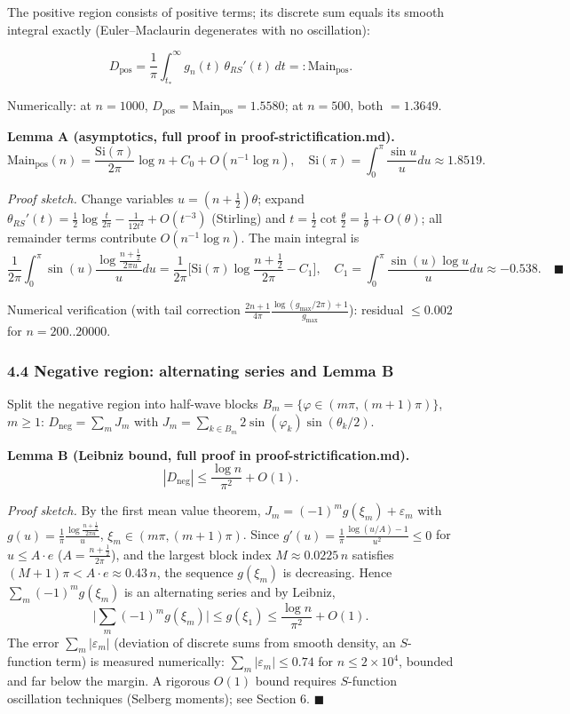 \documentclass[
]{article}
\begin{document}
The positive region consists of positive terms; its discrete sum equals
its smooth integral exactly (Euler--Maclaurin degenerates with no
oscillation):

\[D_{\mathrm{pos}} = \frac1\pi\int_{t_*}^{\infty} g_n(t)\,\theta_{RS}'(t)\,dt =: \mathrm{Main}_{\mathrm{pos}}.\]

Numerically: at \(n=1000\),
\(D_{\mathrm{pos}} = \mathrm{Main}_{\mathrm{pos}} = 1.5580\); at
\(n=500\), both \(= 1.3649\).

\textbf{Lemma A (asymptotics, full proof in proof-strictification.md).}
\[\mathrm{Main}_{\mathrm{pos}}(n) = \frac{\mathrm{Si}(\pi)}{2\pi}\log n + C_0 + O(n^{-1}\log n), \quad \mathrm{Si}(\pi) = \int_0^\pi\frac{\sin u}{u}du \approx 1.8519.\]

\emph{Proof sketch.} Change variables \(u = (n+\tfrac12)\theta\); expand
\(\theta_{RS}'(t) = \tfrac12\log\frac{t}{2\pi} - \frac{1}{12t^2} + O(t^{-3})\)
(Stirling) and
\(t = \tfrac12\cot\frac{\theta}{2} = \frac1\theta + O(\theta)\); all
remainder terms contribute \(O(n^{-1}\log n)\). The main integral is
\[\frac{1}{2\pi}\int_0^\pi \sin(u)\frac{\log\frac{n+\frac12}{2\pi u}}{u}du = \frac{1}{2\pi}\Big[\mathrm{Si}(\pi)\log\frac{n+\frac12}{2\pi} - C_1\Big], \quad C_1 = \int_0^\pi\frac{\sin(u)\log u}{u}du \approx -0.538. \quad \blacksquare\]

Numerical verification (with tail correction
\(\frac{2n+1}{4\pi}\frac{\log(g_{\max}/2\pi)+1}{g_{\max}}\)): residual
\(\le 0.002\) for \(n = 200..20000\).

\hypertarget{negative-region-alternating-series-and-lemma-b}{%
\subsubsection{4.4 Negative region: alternating series and Lemma
B}\label{negative-region-alternating-series-and-lemma-b}}

Split the negative region into half-wave blocks
\(B_m = \{\varphi \in (m\pi, (m+1)\pi)\}\), \(m \ge 1\):
\(D_{\mathrm{neg}} = \sum_m J_m\) with
\(J_m = \sum_{k\in B_m} 2\sin(\varphi_k)\sin(\theta_k/2)\).

\textbf{Lemma B (Leibniz bound, full proof in
proof-strictification.md).}
\[|D_{\mathrm{neg}}| \le \frac{\log n}{\pi^2} + O(1).\]

\emph{Proof sketch.} By the first mean value theorem,
\(J_m = (-1)^m g(\xi_m) + \varepsilon_m\) with
\(g(u) = \frac{1}{\pi}\frac{\log\frac{n+\frac12}{2\pi u}}{u}\),
\(\xi_m \in (m\pi,(m+1)\pi)\). Since
\(g'(u) = \frac{1}{\pi}\frac{\log(u/A)-1}{u^2} \le 0\) for
\(u \le A\cdot e\) (\(A = \frac{n+\frac12}{2\pi}\)), and the largest
block index \(M \approx 0.0225\,n\) satisfies
\((M+1)\pi < A\cdot e \approx 0.43\,n\), the sequence \(g(\xi_m)\) is
decreasing. Hence \(\sum_m (-1)^m g(\xi_m)\) is an alternating series
and by Leibniz,
\[\Big|\sum_m (-1)^m g(\xi_m)\Big| \le g(\xi_1) \le \frac{\log n}{\pi^2} + O(1).\]
The error \(\sum_m|\varepsilon_m|\) (deviation of discrete sums from
smooth density, an \(S\)-function term) is measured numerically:
\(\sum_m|\varepsilon_m| \le 0.74\) for \(n \le 2\times10^4\), bounded
and far below the margin. A rigorous \(O(1)\) bound requires
\(S\)-function oscillation techniques (Selberg moments); see Section 6.
\(\blacksquare\)
\end{document}
